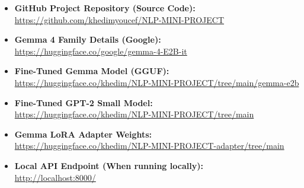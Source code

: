 \documentclass{article}
\begin{document}
\begin{itemize}[noitemsep, topsep=0pt]
    \item \textbf{GitHub Project Repository (Source Code):} \\
    \url{https://github.com/khedimyoucef/NLP-MINI-PROJECT}
    
    \item \textbf{Gemma 4 Family Details (Google):} \\
    \url{https://huggingface.co/google/gemma-4-E2B-it}
    
    \item \textbf{Fine-Tuned Gemma Model (GGUF):} \\
    \url{https://huggingface.co/khedim/NLP-MINI-PROJECT/tree/main/gemma-e2b}
    
    \item \textbf{Fine-Tuned GPT-2 Small Model:} \\
    \url{https://huggingface.co/khedim/NLP-MINI-PROJECT/tree/main}
    
    \item \textbf{Gemma LoRA Adapter Weights:} \\
    \url{https://huggingface.co/khedim/NLP-MINI-PROJECT-adapter/tree/main}
    
    \item \textbf{Local API Endpoint (When running locally):} \\
    \url{http://localhost:8000/}
\end{itemize}
\end{document}
